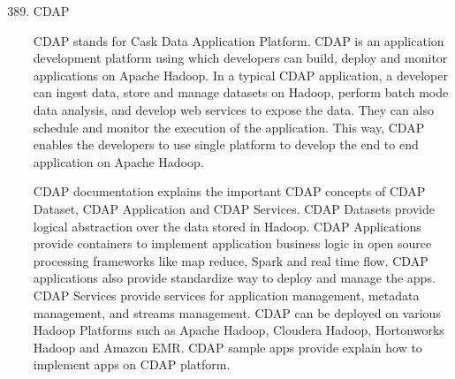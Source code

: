 \begin{enumerate}
\setcounter{enumi}{388}
\item {} 
CDAP

CDAP \label{\detokenize{i524/technologies:id706}}{\hyperref[\detokenize{i524/technologies:www-cdap}]{\sphinxcrossref{{[}616{]}}}} stands for Cask Data Application
Platform. CDAP is an application development platform using which
developers can build, deploy and monitor applications on Apache
Hadoop. In a typical CDAP application, a developer can ingest
data, store and manage datasets on Hadoop, perform batch mode
data analysis, and develop web services to expose the data.  They
can also schedule and monitor the execution of the
application. This way, CDAP enables the developers to use single
platform to develop the end to end application on Apache Hadoop.

CDAP documentation \label{\detokenize{i524/technologies:id707}}{\hyperref[\detokenize{i524/technologies:www-cdap-docs}]{\sphinxcrossref{{[}617{]}}}} explains the important
CDAP concepts of CDAP Dataset, CDAP Application and CDAP
Services. CDAP Datasets provide logical abstraction over the data
stored in Hadoop. CDAP Applications provide containers to
implement application business logic in open source processing
frameworks like map reduce, Spark and real time flow. CDAP
applications also provide standardize way to deploy and manage
the apps. CDAP Services provide services for application
management, metadata management, and streams management.  CDAP
can be deployed on various Hadoop Platforms such as Apache
Hadoop, Cloudera Hadoop, Hortonworks Hadoop and Amazon EMR.  CDAP
sample apps \label{\detokenize{i524/technologies:id708}}{\hyperref[\detokenize{i524/technologies:github-cdap-sample-apps}]{\sphinxcrossref{{[}618{]}}}} provide explain how
to implement apps on CDAP platform.

\end{enumerate}
